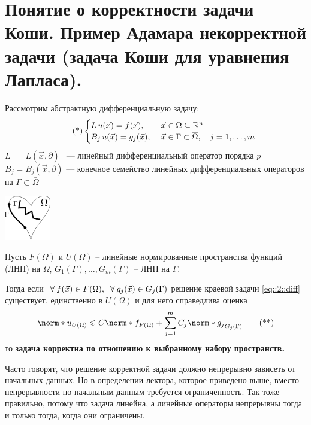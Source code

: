 \documentclass[../main.tex]{subfiles}
\begin{document}
\section[Корректность задачи Коши]{Понятие о корректности задачи Коши. Пример Адамара некорректной задачи (задача Коши для уравнения Лапласа).}


Рассмотрим абстрактную дифференциальную задачу:
\begin{equation}
\label{eq::2::diff}
\tag{*}
\begin{cases} L\, u(\vec{x}) = f(\vec{x}),\ &\vec{x} \in \Omega \subseteq \mathbb{R}^n  \\
B_j\, u(\vec{x}) = g_j(\vec{x}),\ &\vec{x}\in \Gamma \subset \overline{\Omega},\quad j = 1, \ldots, m
\end{cases}
\end{equation}
$L\;\, = L(\vec{x}, \partial)\;\,$ --- линейный дифференциальный оператор порядка $p$\\
$B_j = B_j(\vec{x}, \partial)$ --- конечное семейство линейных дифференциальных операторов на $\Gamma \subset \bar{\Omega}$

\begin{center}
\includegraphics[width=0.15\textwidth]{pic 4_1.pdf}
\end{center}

\begin{definition}
Пусть $F(\Omega)$ и $U(\Omega)$ -- линейные нормированные пространства функций (ЛНП) на $\Omega$, \; $G_1(\Gamma),\dots, G_m(\Gamma)$ -- ЛНП на $\Gamma$.

Тогда если $\ \forall\: f(\vec{x}) \in F(\Omega), \;\;\forall\: g_j(\vec{x}) \in G_j(\Gamma)$ решение краевой задачи \eqref{eq::2::diff} существует, единственно в $U(\Omega)$ и для него справедлива оценка
\begin{equation}
    \norm*{u}_{U(\Omega)} \leq C\norm*{f}_{F(\Omega)} + \sum\limits_{j=1}^{m}C_j\norm*{g_j}_{G_j(\Gamma)}
\label{eq::2::neq}
\tag{**}
\end{equation}
то {\bf задача корректна по отношению к выбранному набору пространств.}
\end{definition}

\begin{remark}
    Часто говорят, что решение корректной задачи должно непрерывно зависеть от начальных данных. Но в определении лектора, которое приведено выше, вместо непрерывности по начальным данным требуется ограниченность. Так тоже правильно, потому что задача линейна, а линейные операторы непрерывны тогда и только тогда, когда они ограничены.
\end{remark}
\end{document}
